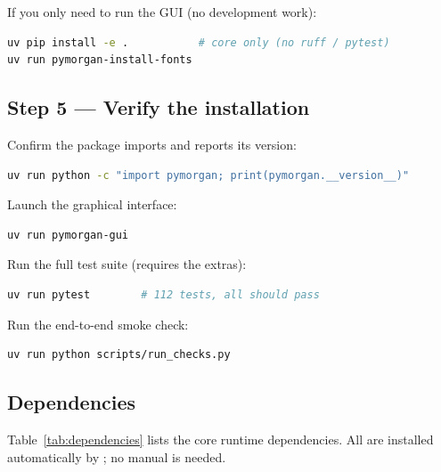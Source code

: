 \noindent If you only need to run the GUI (no development work):

\begin{lstlisting}[language=bash, style=py]
uv pip install -e .           # core only (no ruff / pytest)
uv run pymorgan-install-fonts
\end{lstlisting}

\subsection{Step 5 — Verify the installation}\label{sec:verify}

Confirm the package imports and reports its version:

\begin{lstlisting}[language=bash, style=py]
uv run python -c "import pymorgan; print(pymorgan.__version__)"
\end{lstlisting}

Launch the graphical interface:

\begin{lstlisting}[language=bash, style=py]
uv run pymorgan-gui
\end{lstlisting}

Run the full test suite (requires the  extras):

\begin{lstlisting}[language=bash, style=py]
uv run pytest        # 112 tests, all should pass
\end{lstlisting}

Run the end-to-end smoke check:

\begin{lstlisting}[language=bash, style=py]
uv run python scripts/run_checks.py
\end{lstlisting}

\subsection{Dependencies}\label{sec:dependencies}

Table~\ref{tab:dependencies} lists the core runtime dependencies. All are
installed automatically by ; no manual
 is needed.

